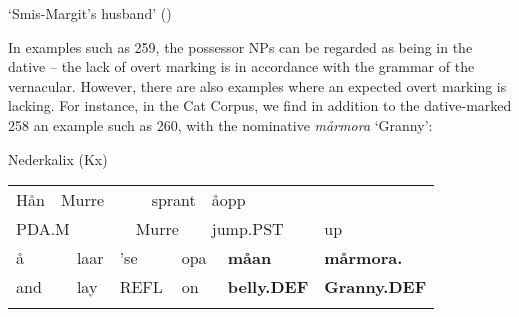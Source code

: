 \begin{styleTranslation}
‘Smis-Margit’s husband’ (\citet[97]{Levander1909})

\end{styleTranslation}

\begin{styleBodyTextFirst}
In examples such as 259, the possessor NPs can be regarded as being in the dative – the lack of overt marking is in accordance with the grammar of the vernacular. However, there are also examples where an expected overt marking is lacking. For instance, in the Cat Corpus, we find in addition to the dative-marked 258 an example such as 260, with the nominative \textit{mårmora} ‘Granny’: 

\end{styleBodyTextFirst}

\begin{listWWNumileveli}
\item 

\begin{styleExample}
\label{bkm:Ref110681866}Nederkalix (Kx)

\end{styleExample}

\end{listWWNumileveli}

\begin{tabular}{llllllllll}
\lsptoprule
Hån & \multicolumn{4}{l}{Murre

} & \multicolumn{2}{l}{sprant

} & \multicolumn{2}{l}{åopp

} & \\
\multicolumn{4}{l}{PDA.M

} & \multicolumn{3}{l}{Murre

} & \multicolumn{2}{l}{jump.PST

} & up\\
\multicolumn{2}{l}{å

} & laar & \multicolumn{3}{l}{’se

} & \multicolumn{2}{l}{opa

} & {\bfseries måan} & {\bfseries mårmora.}\\
\multicolumn{2}{l}{and

} & lay & \multicolumn{3}{l}{REFL

} & \multicolumn{2}{l}{on

} & {\bfseries belly.DEF} & {\bfseries Granny.DEF}\\
\lspbottomrule
\end{tabular}

